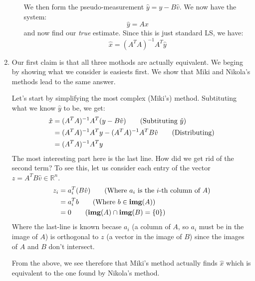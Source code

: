 \documentclass[12pt]{exam}
\begin{document}
\begin{questions}
\begin{solution}
\begin{enumerate}[label=(\alph*)]
\begin{itemize}
          We then form the pseudo-measurement $\hat{y} = y - B\hat{v}$. We now have the system:
          \[
            \hat{y} = Ax
          \]
          and now find our \textit{true} estimate. Since this is just standard LS, we have:
          \[
            \hat{x} = (A^TA)^{-1}A^T\hat{y}
          \]
        \end{itemize}
      \item Our first claim is that all three mothods are actually equivalent. We beging by showing what we consider is easiests first. We show that Miki and Nikola's methods lead to the same answer. 

      Let's start by simplifying the most complex (Miki's) method.
      Subtituting what we know $\hat{y}$ to be, we get:
      \begin{align*}
        \hat{x} &= (A^TA)^{-1}A^T(y - B\hat{v}) \tag{Subtituting $\hat{y}$} \\
        &= (A^TA)^{-1}A^Ty - (A^TA)^{-1}A^TB\hat{v} \tag{Distributing} \\
        &= (A^TA)^{-1}A^Ty
      \end{align*}
      The most interesting part here is the last line. How did we get rid of the second term? To see this, let us consider each entry of the vector $z = A^TB\hat{v} \in \mathbb{R}^{n}$. 
      \begin{align*}
        z_i &= a_i^T (B\hat{v}) \tag{Where $a_i$ is the $i$-th column of $A$} \\
        &= a_i^Tb \tag{Where $b \in \textbf{img}(A)$} \\
        &= 0 \tag{$\textbf{img}(A) \cap \textbf{img}(B) = \{ 0\}$}
      \end{align*}
      Where the last-line is known becase $a_i$ (a column of $A$, so $a_i$ must be in the image of $A$) is orthogonal to $z$ (a vector in the image of $B$) since the images of $A$ and $B$ don't intersect. 

      From the above, we see therefore that Miki's method actually finds $\hat{x}$ which is equivalent to the one found by Nikola's method.


\end{enumerate}
\end{solution}
\end{questions}
\end{document}
